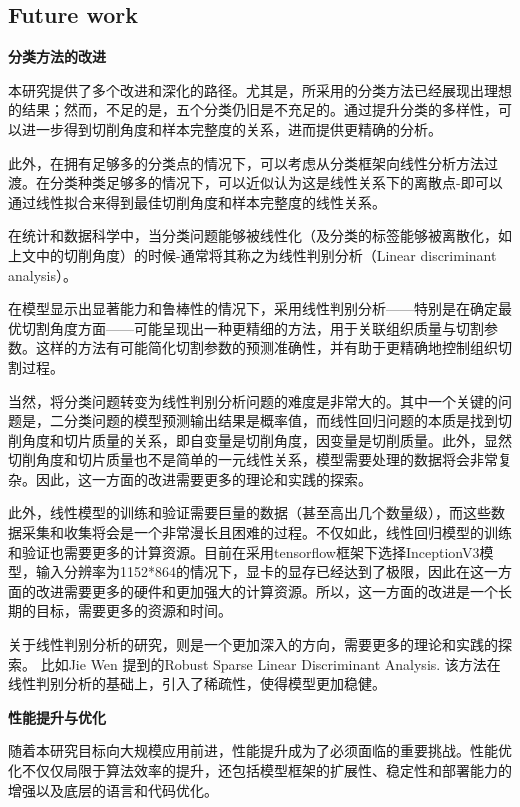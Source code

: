 \subsection{Future work}

\textbf{分类方法的改进}

本研究提供了多个改进和深化的路径。尤其是，所采用的分类方法已经展现出理想的结果；然而，不足的是，五个分类仍旧是不充足的。通过提升分类的多样性，可以进一步得到切削角度和样本完整度的关系，进而提供更精确的分析。

此外，在拥有足够多的分类点的情况下，可以考虑从分类框架向线性分析方法过渡。在分类种类足够多的情况下，可以近似认为这是线性关系下的离散点-即可以通过线性拟合来得到最佳切削角度和样本完整度的线性关系。

在统计和数据科学中，当分类问题能够被线性化（及分类的标签能够被离散化，如上文中的切削角度）的时候-通常将其称之为线性判别分析（Linear discriminant analysis）。

在模型显示出显著能力和鲁棒性的情况下，采用线性判别分析——特别是在确定最优切割角度方面——可能呈现出一种更精细的方法，用于关联组织质量与切割参数。这样的方法有可能简化切割参数的预测准确性，并有助于更精确地控制组织切割过程。

当然，将分类问题转变为线性判别分析问题的难度是非常大的。其中一个关键的问题是，二分类问题的模型预测输出结果是概率值，而线性回归问题的本质是找到切削角度和切片质量的关系，即自变量是切削角度，因变量是切削质量。此外，显然切削角度和切片质量也不是简单的一元线性关系，模型需要处理的数据将会非常复杂。因此，这一方面的改进需要更多的理论和实践的探索。

此外，线性模型的训练和验证需要巨量的数据（甚至高出几个数量级），而这些数据采集和收集将会是一个非常漫长且困难的过程。不仅如此，线性回归模型的训练和验证也需要更多的计算资源。目前在采用tensorflow框架下选择InceptionV3模型，输入分辨率为1152*864的情况下，显卡的显存已经达到了极限，因此在这一方面的改进需要更多的硬件和更加强大的计算资源。所以，这一方面的改进是一个长期的目标，需要更多的资源和时间。

关于线性判别分析的研究，则是一个更加深入的方向，需要更多的理论和实践的探索。
比如Jie Wen 提到的Robust Sparse Linear Discriminant Analysis\cite{6.1}. 该方法在线性判别分析的基础上，引入了稀疏性，使得模型更加稳健。




\textbf{性能提升与优化}

随着本研究目标向大规模应用前进，性能提升成为了必须面临的重要挑战。性能优化不仅仅局限于算法效率的提升，还包括模型框架的扩展性、稳定性和部署能力的增强以及底层的语言和代码优化。

